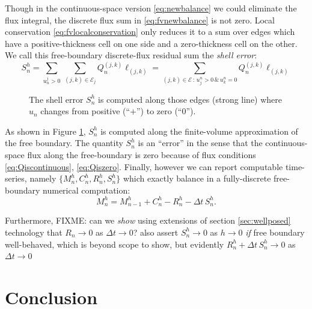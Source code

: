 \documentclass[final,leqno,onefignum,onetabnum]{siamltex1213bueler}
\begin{document}
Though in the continuous-space version \eqref{eq:newbalance} we could eliminate the flux integral, the discrete flux sum in \eqref{eq:fvnewbalance} is not zero.  Local conservation \eqref{eq:fvlocalconservation} only reduces it to a sum over edges which have a positive-thickness cell on one side and a zero-thickness cell on the other.  We call this free-boundary discrete-flux residual sum the \emph{shell error}:
\begin{equation}
S_n^h = \sum_{u_n^j>0}\, \sum_{(j,k)\in\mathcal{E}_j} Q_n^{(j,k)} \ell_{(j,k)} = \sum_{(j,k)\in\mathcal{E} \,:\, u_j^n > 0 \,\&\, u_k^n = 0} Q_n^{(j,k)} \ell_{(j,k)} \label{eq:fvderiveshellerror}
\end{equation}

\begin{figure}[ht]
\begin{center}

\end{center}
\caption{The shell error $S_n^h$ is computed along those edges (strong line) where $u_n$ changes from positive (``$+$'') to zero (``$0$'').}
\label{fig:fvmesh-shellerror}
\end{figure}

As shown in Figure \ref{fig:fvmesh-shellerror}, $S_n^h$ is computed along the finite-volume approximation of the free boundary.  The quantity $S_n^h$ is an ``error'' in the sense that the continuous-space flux along the free-boundary is zero because of flux conditions \eqref{eq:Qiscontinuous}, \eqref{eq:Qiszero}.  Finally, however we can report computable time-series, namely $\{M_n^h,C_n^h,R_n^h,S_n^h\}$ which exactly balance in a fully-discrete free-boundary numerical computation:
\begin{equation}
  M_n^h = M_{n-1}^h + C_n^h - R_n^h - \Delta t\,S_n^h. \label{eq:fvfinalbalance}
\end{equation}

Furthermore, FIXME: can we \emph{show} using extensions of section \ref{sec:wellposed} technology that $R_n\to 0$ as $\Delta t\to 0$?  also assert $S_n^h\to 0$ as $h\to 0$ \emph{if} free boundary well-behaved, which is beyond scope to show, but evidently $R_n^h + \Delta t\,S_n^h \to 0$ as $\Delta t\to 0$


\section{Conclusion} \label{sec:conclusion}
\end{document}
